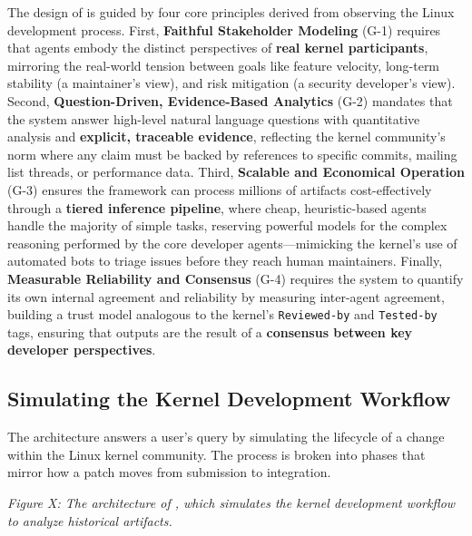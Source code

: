 The design of \sys is guided by four core principles derived from observing the Linux development process. First, \textbf{Faithful Stakeholder Modeling} (G-1) requires that agents embody the distinct perspectives of \textbf{real kernel participants}, mirroring the real-world tension between goals like feature velocity, long-term stability (a maintainer's view), and risk mitigation (a security developer's view). Second, \textbf{Question-Driven, Evidence-Based Analytics} (G-2) mandates that the system answer high-level natural language questions with quantitative analysis and \textbf{explicit, traceable evidence}, reflecting the kernel community's norm where any claim must be backed by references to specific commits, mailing list threads, or performance data. Third, \textbf{Scalable and Economical Operation} (G-3) ensures the framework can process millions of artifacts cost-effectively through a \textbf{tiered inference pipeline}, where cheap, heuristic-based agents handle the majority of simple tasks, reserving powerful models for the complex reasoning performed by the core developer agents—mimicking the kernel's use of automated bots to triage issues before they reach human maintainers. Finally, \textbf{Measurable Reliability and Consensus} (G-4) requires the system to quantify its own internal agreement and reliability by measuring inter-agent agreement, building a trust model analogous to the kernel's \texttt{Reviewed-by} and \texttt{Tested-by} tags, ensuring that outputs are the result of a \textbf{consensus between key developer perspectives}.


\subsection{Simulating the Kernel Development Workflow}

The \sys architecture answers a user's query by simulating the lifecycle of a change within the Linux kernel community. The process is broken into phases that mirror how a patch moves from submission to integration.

\emph{Figure X: The architecture of \sys, which simulates the kernel development workflow to analyze historical artifacts.}

